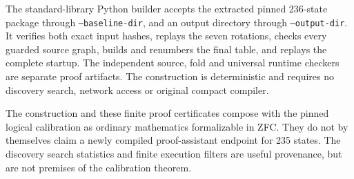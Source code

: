 The standard-library Python builder accepts the extracted pinned
236-state package through \texttt{--baseline-dir}, and an output
directory through \texttt{--output-dir}.  It verifies both exact input
hashes, replays the seven rotations, checks every guarded source graph,
builds and renumbers the final table, and replays the complete startup.
The independent source, fold and universal runtime checkers are
separate proof artifacts.  The construction is deterministic and
requires no discovery search, network access or original compact
compiler.

The construction and these finite proof certificates compose with
the pinned logical calibration as ordinary mathematics formalizable
in ZFC.  They do not by themselves claim a newly compiled proof-assistant
endpoint for 235 states.  The discovery search statistics and finite
execution filters are useful provenance, but are not premises of the
calibration theorem.

